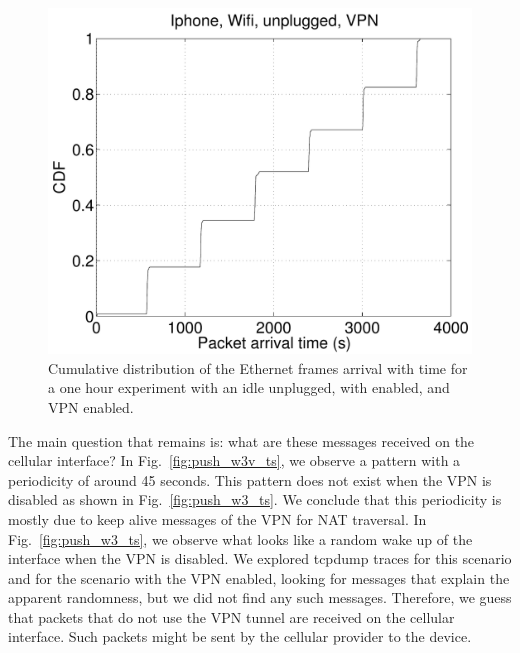\begin{figure}
\centering
        \includegraphics[width=0.8\linewidth]{../../code/pushNotification/Fig/bw_iphone_wifi_unplug_vpn_ts.pdf}
  \caption{Cumulative distribution of the Ethernet frames
          arrival with time for a one hour experiment with an idle
          \iphone{} unplugged, with \wifi{} enabled, and VPN
          enabled.}
  \label{fig:push_wv_ts}
   \vspace{\postfigspace}
\end{figure}


The main question that remains is: what are these messages received on
the cellular interface? In Fig.~\ref{fig:push_w3v_ts}, we observe a pattern
with a periodicity of around 45 seconds. This pattern does not exist
when the VPN is disabled as shown in Fig.~\ref{fig:push_w3_ts}. We
conclude that this periodicity is mostly due to keep alive messages of the
VPN for NAT traversal. In Fig.~\ref{fig:push_w3_ts}, we observe what looks like
a random wake up of the \wifi interface when the VPN is disabled. We
explored tcpdump traces for this scenario and for the scenario with
the VPN enabled, looking for messages that explain the apparent
randomness, but we did not find any such messages. Therefore, we guess
that packets that do not use the VPN tunnel are received on the cellular 
interface. Such packets might be sent by the cellular provider to the
device. 

 

